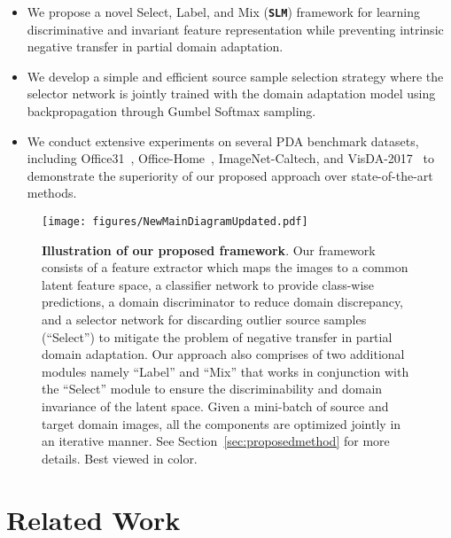 \documentclass[10pt,twocolumn,letterpaper]{article}
\def\ours{\texttt{\textbf{SLM}}\xspace}
\begin{document}
\begin{itemize}
\setlength{\itemsep}{-1pt}
    \item We propose a novel Select, Label, and Mix (\ours) framework for learning discriminative and invariant feature representation while preventing intrinsic negative transfer in partial domain adaptation. 
    \item We develop a simple and efficient source sample selection strategy where the selector network is jointly trained with the domain adaptation model using backpropagation through Gumbel Softmax sampling.
    \item We conduct extensive experiments on several PDA benchmark datasets, including Office31~\cite{saenko2010adapting}, Office-Home~\cite{venkateswara2017deep}, ImageNet-Caltech, and VisDA-2017~\cite{peng2017visda} to demonstrate the superiority of our proposed approach over state-of-the-art methods.
\end{itemize}
 

\begin{figure*}[!thbp]
	\begin{center}
	\texttt{[image: figures/NewMainDiagramUpdated.pdf]}
	\end{center}
	\vskip -0.25in
	\caption{\small \textbf{Illustration of our proposed framework}.
	Our framework consists of a feature extractor  which maps the images to a common latent feature space, a classifier network  to provide class-wise predictions, a domain discriminator  to reduce domain discrepancy, and a selector network  for discarding outlier source samples (\enquote{Select}) to mitigate the problem of negative transfer in partial domain adaptation. Our approach also comprises of two additional modules namely \enquote{Label} and \enquote{Mix} that works in conjunction with the \enquote{Select} module to ensure the discriminability and domain invariance of the latent space. Given a mini-batch of source and target domain images, all the components are optimized jointly in an iterative manner. See Section~\ref{sec:proposedmethod} for more details. Best viewed in color.}
	\label{fig:main_figure}
 	\vskip -0.1in
\end{figure*} 
\section{Related Work}
\label{sec:relatedwork}
\end{document}
